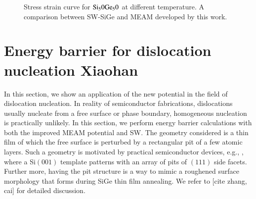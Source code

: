 \documentclass[review]{elsarticle}
\begin{document}
\begin{figure}[H]
\hfill
{}
\caption{Stress strain curve for ${\rm Si_50Ge_50}$ at different temperature. A comparison between SW-SiGe and MEAM developed by this work.}
\label{fig:sscurve}
\end{figure}

\section{Energy barrier for dislocation nucleation {\color{red} Xiaohan}} \label{sec:nucleation}
In this section, we show an application of the new potential in the field of dislocation nucleation. In reality of semiconductor fabrications, dislocations usually nucleate from a free surface or phase boundary, homogeneous nucleation is practically unlikely. In this section, we perform energy barrier calculations with both the improved MEAM potential and SW. The geometry considered is a thin film of which the free surface is perturbed by a rectangular pit of a few atomic layers. Such a geometry is motivated by practical semiconductor devices, e.g., \cite{grydlik2012misfit}, where a Si$(001)$ template patterns with an array of pits of $(111)$ side facets. Further more, having the pit structure is a way to mimic a roughened surface morphology that forms during SiGe thin film annealing. We refer to [cite zhang, cai] for detailed discussion.
\end{document}
